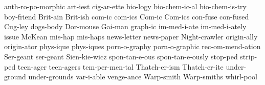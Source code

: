   

\hyphenation
{
	anth-ro-po-morphic 
	art-iest cig-ar-ette 
	bio-logy bio-chem-ic-al bio-chem-is-try
	boy-friend
	Brit-ain Brit-ish
	com-ic com-ics Com-ic Com-ics
	con-fuse con-fused Cug-ley
	dogs-body
	Dor-mouse
	Gai-man 
	graph-ic 
	im-med-i-ate im-med-i-ately issue
	McKean
	mis-hap mis-haps
	news-letter news-paper
	Night-crawler
	origin-ally origin-ator
	phys-ique phys-iques 
	porn-o-graphy porn-o-graphic 
	rec-om-mend-ation
	Ser-geant ser-geant 
	Sien-kie-wicz
	spon-tan-e-ous spon-tan-e-ously
	stop-ped
	strip-ped
	teen-ager teen-agers
	tem-per-men-tal
	Thatch-er-ism Thatch-er-ite
	under-ground under-grounds
	var-i-able
	venge-ance
	Warp-smith Warp-smiths 
	whirl-pool
}
